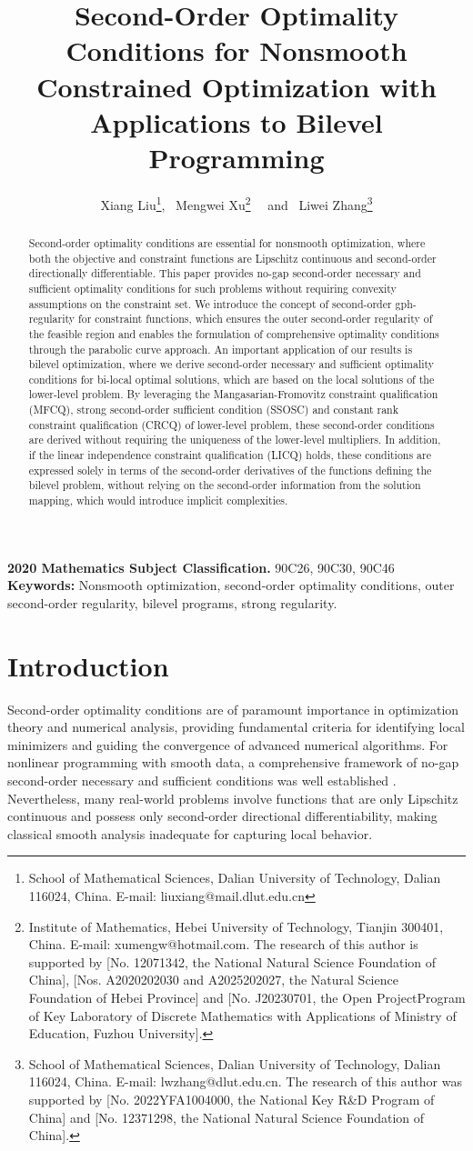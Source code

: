 \documentclass[11pt]{article}
\title{Second-Order Optimality Conditions for Nonsmooth Constrained Optimization with Applications to Bilevel Programming}
\author{Xiang Liu\thanks{\baselineskip 9pt School of Mathematical Sciences, Dalian University of Technology, Dalian 116024, China. E-mail: liuxiang@mail.dlut.edu.cn}, \
Mengwei Xu\thanks{\baselineskip 9pt Institute of Mathematics, Hebei University of Technology, Tianjin 300401, China.
E-mail: xumengw@hotmail.com. The research of this author is supported by [No. 12071342, the National Natural
Science Foundation of China], [Nos. A2020202030 and A2025202027, the Natural Science Foundation of Hebei Province] and [No. J20230701, the Open ProjectProgram of Key Laboratory of
Discrete Mathematics with Applications of Ministry of Education, Fuzhou University].}  \   \ and \ Liwei Zhang\thanks{\baselineskip 9pt
School of Mathematical Sciences, Dalian University of Technology, Dalian 116024, China. E-mail: lwzhang@dlut.edu.cn. The
research of this author was supported by [No. 2022YFA1004000, the National Key R\&D Program of China] and [No. 12371298, the National Natural Science Foundation of China]. }
}
\theoremstyle{definition}
\theoremstyle{remark}
\numberwithin{equation}{section}
\begin{document}
\maketitle
\begin{abstract}
Second-order optimality conditions are essential for nonsmooth optimization, where both the objective and constraint functions are Lipschitz continuous and second-order directionally differentiable. This paper provides no-gap second-order necessary and sufficient optimality conditions for such problems without requiring convexity assumptions on the constraint set. We introduce the concept of second-order gph-regularity for constraint functions, which ensures the outer second-order regularity of the feasible region and enables the formulation of comprehensive optimality conditions through the parabolic curve approach.
An important application of our results is bilevel optimization, where we derive second-order necessary and sufficient optimality conditions for bi-local optimal solutions, which are based on the
local solutions of the lower-level problem.
By leveraging  the  Mangasarian-Fromovitz constraint qualification (MFCQ),   strong second-order sufficient condition (SSOSC) and constant rank constraint
qualification (CRCQ) of lower-level problem,
these second-order conditions  are derived without  requiring the uniqueness of the lower-level
multipliers.
In addition, if the linear independence constraint qualification (LICQ) holds, these conditions are expressed solely in terms of the second-order derivatives
 of the functions defining the bilevel problem, without relying on the second-order information
 from the solution mapping, which would introduce implicit complexities.
\end{abstract}

{\bf 2020 Mathematics Subject Classification.} 90C26, 90C30, 90C46 \\

{\bf Keywords:} Nonsmooth optimization, second-order optimality conditions, outer second-order regularity, bilevel programs, strong regularity.\\

\newpage

\baselineskip 18pt
\parskip 2pt
\section{Introduction}

Second-order optimality conditions are of paramount importance in optimization theory and numerical analysis, providing fundamental criteria for identifying local minimizers and guiding the convergence of advanced numerical algorithms. For nonlinear programming with smooth data, a comprehensive framework of no-gap second-order necessary and sufficient conditions was well established  \cite{Ioffe 79,Ben-Tal 80,Ben-Tal 82}.
Nevertheless, many real-world problems involve functions that are only Lipschitz continuous and possess only second-order directional differentiability, making classical smooth analysis inadequate for capturing  local behavior.
\end{document}
